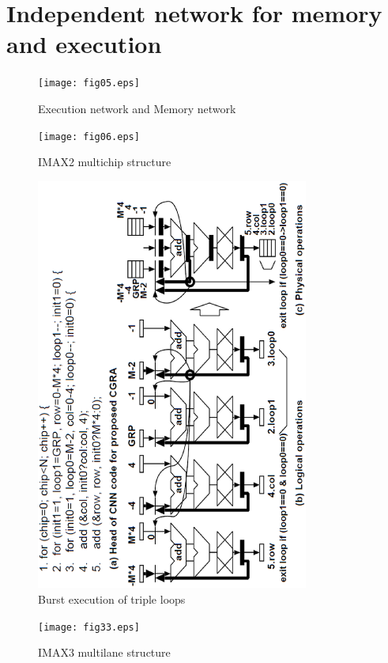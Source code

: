 \section{Independent network for memory and execution}

\begin{figure}[htbp]
\center
\texttt{[image: fig05.eps]}
\caption{\label{fig:mesh}Execution network and Memory network}
\end{figure}

\begin{figure}[htbp]
\center
\texttt{[image: fig06.eps]}
\caption{\label{fig:ring}IMAX2 multichip structure}
\end{figure}

\begin{figure}[htbp]
\center
\includegraphics[angle=270,origin=b,width=0.80\textwidth]{fig30.eps}
\caption{\label{fig:loopctrl}Burst execution of triple loops}
\end{figure}

\begin{figure}[htbp]
\center
\texttt{[image: fig33.eps]}
\caption{\label{fig:multilane}IMAX3 multilane structure}
\end{figure}

